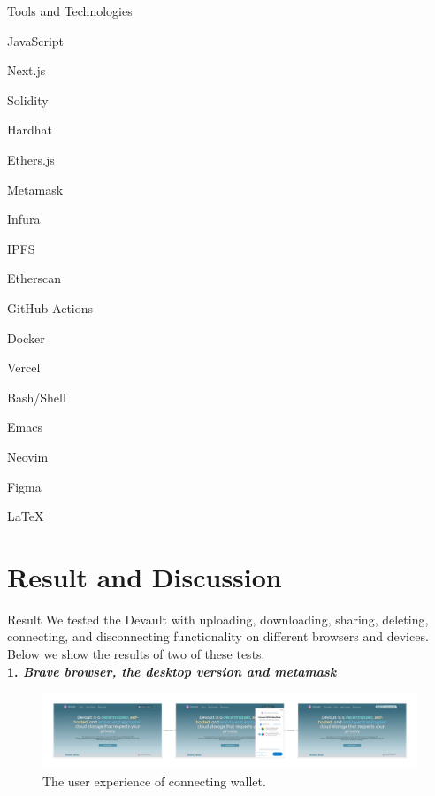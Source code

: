 \documentclass[aspectratio=169,usenames,dvipsnames,pdftex]{beamer}
\begin{document}
  \begin{frame}{Tools and Technologies}
    \begin{itemize}
      \begin{multicols}{3}
      \item JavaScript
      \item \faReact{} Next.js
      \item Solidity
      \item Hardhat
      \item Ethers.js
      \item Metamask
      \item Infura
      \item IPFS
      \item Etherscan
      \item \faCodeBranch{} GitHub Actions
      \item \faDocker{} Docker
      \item Vercel
      \item Bash/Shell
      \item Emacs
      \item Neovim
      \item Figma
      \item LaTeX
      \end{multicols}
    \end{itemize}
  \end{frame}

  \section{Result and Discussion}

  \begin{frame}{Result}
    We tested the Devault with uploading, downloading, sharing, deleting, connecting, and disconnecting functionality on different browsers and devices. Below we show the results of two of these tests. \\

    \textbf{1. \textit{Brave browser, the desktop version and metamask}} \\

    \begin{figure}
      \includegraphics[width=\textwidth]{connect_result.png}
      \caption{The user experience of connecting wallet.}
    \end{figure}
  \end{frame}
\end{document}
